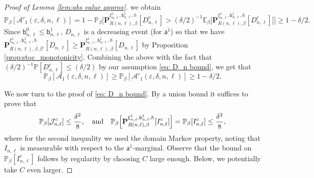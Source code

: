 \documentclass[11pt,a4paper]{article}
\numberwithin{equation}{section}
\theoremstyle{plain}
\theoremstyle{definition}
\begin{document}
\begin{proof}[Proof of Lemma \textup{\ref{lem:abs value approx}}]
we obtain 
\begin{equation}
\mathbb{P}_\beta [\mathcal A'_1(\varepsilon,\delta,n,\ell)] = 1- \mathbb P_\beta \Big[ \mathbf P^{\xi^1_{n,\ell}, \mathsf b^1_{n,\ell},h}_{R(n,\ell), \beta}[D^c_{n,\ell}] > (\delta/2)^{-1}\mathbb E_\beta\big[\mathbf P^{\xi^1_{n,\ell}, \mathsf b^1_{n,\ell},h}_{R(n,\ell), \beta}[D^c_{n,\ell}]\big] \Big]\geq 
1-\delta/2.
\end{equation}
Since $\mathsf{b}^0_{n,\ell}\leq \mathsf{b}^1_{n,\ell}$, $D_{n,\ell}$ is a decreasing event (for $\mathsf{a}^1$) so that we have $\mathbf P^{\xi^1_{n,\ell}, \mathsf b^1_{n,\ell},h}_{R(n,\ell), \beta,\beta'}[D_{n,\ell}]\geq \mathbf P^{\xi^1_{n,\ell}, \mathsf b^1_{n,\ell},h}_{R(n,\ell), \beta}[D_{n,\ell}]$ by Proposition \ref{prop:stoc_monotonicity}. Combining the above with the fact that $(\delta/2)^{-1} \mathbb{P}[D^c_{n,\ell}]\leq (\delta/2) $ by our assumption \eqref{eq: D_n bound}, we get that
\begin{equation}
\mathbb{P}_{\beta}[\mathcal A_1(\varepsilon,\delta,n,\ell)]\geq \mathbb{P}_{\beta}[\mathcal A'_1(\varepsilon,\delta,n,\ell)]\geq 1- \delta/2.
\end{equation}

We now turn to the proof of \eqref{eq: D_n bound}. By a union bound it suffices to prove that
\begin{equation}
    \mathbb P_\beta[\mathcal{J}_{n,\ell}^c]\leq \frac{\delta^2}{8}, \quad\textup{and}\quad\mathbb P_\beta\Big[\mathbf P^{\xi^1_{n,\ell}, \mathsf b^1_{n,\ell},h}_{R(n,\ell), \beta}[I_{n,\ell}^c]\Big]= \mathbb P_\beta[I_{n,\ell}^c]\leq \frac{\delta^2}{8},
\end{equation}
where for the second inequality we used the domain Markov property, noting that $I_{n,\ell}$ is measurable with respect to the $\mathsf a^1$-marginal. Observe that the bound on $\mathbb P_\beta[I_{n,\ell}^c]$ follows by regularity by choosing $C$ large enough. Below, we potentially take $C$ even larger.



\end{proof}
\end{document}

